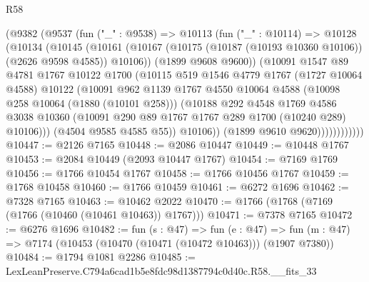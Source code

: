 \begin{lexlean}{R58}
\begin{coremodule}
                  (@9382
                    (@9537
                      (fun ("_" : @9538) =>
                      @10113
                        (fun ("_" : @10114) =>
                        @10128
                          (@10134
                            (@10145
                              (@10161
                                (@10167
                                  (@10175 (@10187 (@10193 @10360 @10106)) (@2626 @9598 @4585))
                                  @10106))
                              (@1899 @9608 @9600))
                            (@10091
                              @1547
                              @89
                              @4781
                              @1767
                              @10122
                              @1700
                              (@10115
                                @519
                                @1546
                                @4779
                                @1767
                                (@1727 @10064 @4588)
                                @10122
                                (@10091
                                  @962
                                  @1139
                                  @1767
                                  @4550
                                  @10064
                                  @4588
                                  (@10098 @258 @10064 (@1880 (@10101 @258)))
                                  (@10188
                                    @292
                                    @4548
                                    @1769
                                    @4586
                                    @3038
                                    @10360
                                    (@10091 @290 @89 @1767 @1767 @289 @1700 (@10240 @289) @10106)))
                                (@4504 @9585 @4585 @55))
                              @10106))
                          (@1899 @9610 @9620))))))))))))
@10447 := @2126 @7165
@10448 := @2086 @10447
@10449 := @10448 @1767
@10453 := @2084 @10449 (@2093 @10447 @1767)
@10454 := @7169 @1769
@10456 := @1766 @10454 @1767
@10458 := @1766 @10456 @1767
@10459 := @1768 @10458
@10460 := @1766 @10459
@10461 := @6272 @1696
@10462 := @7328 @7165
@10463 := @10462 @2022
@10470 := @1766 (@1768 (@7169 (@1766 (@10460 (@10461 @10463)) @1767)))
@10471 := @7378 @7165
@10472 := @6276 @1696
@10482 := fun (s : @47) =>
  fun (e : @47) => fun (m : @47) => @7174 (@10453 (@10470 (@10471 (@10472 @10463))) (@1907 @7380))
@10484 := @1794 @1081 @2286
@10485 := LexLeanPreserve.C794a6cad1b5e8fdc98d1387794c0d40c.R58.__fits_33

\end{coremodule}
\end{lexlean}
